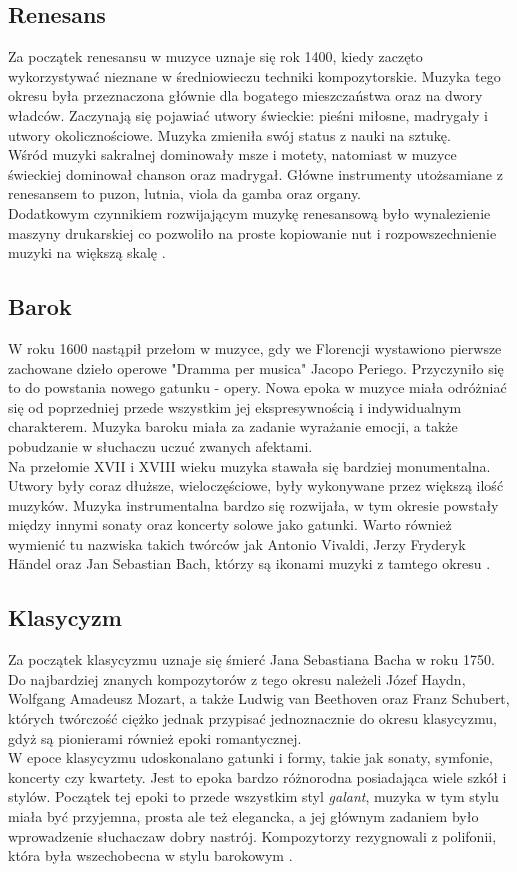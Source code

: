 \documentclass[printmode, eng, openany]{mgr}
\newcommand\tab[1][1cm]{\hspace*{#1}}
\begin{document}
\subsection{Renesans}
\tab Za początek renesansu w muzyce uznaje się rok 1400, kiedy zaczęto wykorzystywać nieznane w średniowieczu techniki kompozytorskie. Muzyka tego okresu była przeznaczona głównie dla bogatego mieszczaństwa oraz na dwory władców. Zaczynają się pojawiać utwory świeckie: pieśni miłosne, madrygały i utwory okolicznościowe. Muzyka zmieniła swój status z nauki na sztukę. \\
\tab Wśród muzyki sakralnej dominowały msze i motety, natomiast w muzyce świeckiej dominował chanson oraz madrygał. Główne instrumenty utożsamiane z renesansem to puzon, lutnia, viola da gamba oraz organy. \\
\tab Dodatkowym czynnikiem rozwijającym muzykę renesansową było wynalezienie maszyny drukarskiej co pozwoliło na proste kopiowanie nut i rozpowszechnienie muzyki na większą skalę \cite{ren}.  
\subsection{Barok}
\tab W roku 1600 nastąpił przełom w muzyce, gdy we Florencji wystawiono pierwsze zachowane dzieło operowe "Dramma per musica" Jacopo Periego. Przyczyniło się to do powstania nowego gatunku - opery. Nowa epoka w muzyce miała odróżniać się od  poprzedniej przede wszystkim jej ekspresywnością i indywidualnym charakterem. Muzyka baroku miała za zadanie wyrażanie emocji, a także pobudzanie w słuchaczu uczuć zwanych afektami.\\
\tab Na przełomie XVII i XVIII wieku muzyka stawała się bardziej monumentalna. Utwory były coraz dłuższe, wieloczęściowe, były wykonywane przez większą ilość muzyków. Muzyka instrumentalna bardzo się rozwijała, w tym okresie powstały między innymi sonaty oraz koncerty solowe jako gatunki. Warto również wymienić tu nazwiska takich twórców jak Antonio Vivaldi, Jerzy Fryderyk Händel oraz Jan Sebastian Bach, którzy są ikonami muzyki z tamtego okresu \cite{bar}. \\
\subsection{Klasycyzm}
\tab Za początek klasycyzmu uznaje się śmierć Jana Sebastiana Bacha w roku 1750. Do najbardziej znanych kompozytorów z tego okresu należeli Józef Haydn, Wolfgang Amadeusz Mozart, a także Ludwig van Beethoven oraz Franz Schubert, których twórczość ciężko jednak przypisać jednoznacznie do okresu klasycyzmu, gdyż są pionierami również epoki romantycznej.\\
\tab W epoce klasycyzmu udoskonalano gatunki i formy, takie jak sonaty, symfonie, koncerty czy kwartety. Jest to epoka bardzo różnorodna posiadająca wiele szkół i stylów. Początek tej epoki to przede wszystkim styl \textit{galant}, muzyka w tym stylu miała być przyjemna, prosta ale też elegancka, a jej głównym zadaniem było wprowadzenie słuchacza\linebreak w dobry nastrój. Kompozytorzy rezygnowali z polifonii, która była wszechobecna w stylu barokowym \cite{clas}. 
\end{document}
